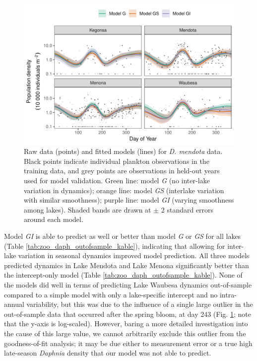 \documentclass[12pt]{article}
\begin{document}
\begin{figure}
\centering
\includegraphics{../figures/Fig17.pdf}
\caption{\label{fig:Fig17}Raw data (points) and fitted models (lines)
for \textit{D. mendota} data. Black points indicate individual plankton
observations in the training data, and grey points are observations in
held-out years used for model validation. Green line: model \emph{G} (no
inter-lake variation in dynamics); orange line: model \emph{GS}
(interlake variation with similar smoothness); purple line: model
\emph{GI} (varying smoothness among lakes). Shaded bands are drawn at
\(\pm\) 2 standard errors around each model.}
\end{figure}

Model \emph{GI} is able to predict as well or better than model \emph{G}
or \emph{GS} for all lakes (Table \ref{tab:zoo_daph_outofsample_kable}),
indicating that allowing for inter-lake variation in seasonal dynamics
improved model prediction. All three models predicted dynamics in Lake
Mendota and Lake Menona significantly better than the intercept-only
model (Table \ref{tab:zoo_daph_outofsample_kable}). None of the models
did well in terms of predicting Lake Waubesa dynamics out-of-sample
compared to a simple model with only a lake-specific intercept and no
intra-annual variability, but this was due to the influence of a single
large outlier in the out-of-sample data that occurred after the spring
bloom, at day 243 (Fig. \ref{fig:Fig17}; note that the y-axis is
log-scaled). However, baring a more detailed investigation into the
cause of this large value, we cannot arbitrarily exclude this outlier
from the goodness-of-fit analysis; it may be due either to measurement
error or a true high late-season \emph{Daphnia} density that our model
was not able to predict.
\end{document}
